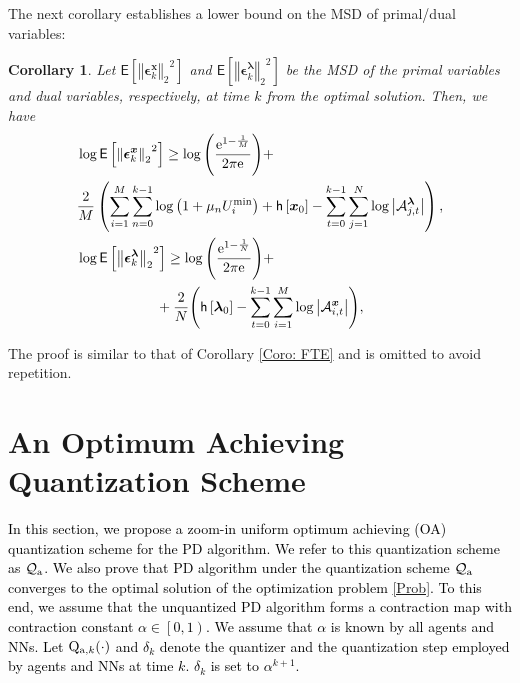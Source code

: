 \documentclass[10pt,twocolumn,twoside]{IEEEtran}
\newtheorem{corollary}{Corollary}
\begin{document}
The next corollary establishes a lower bound on the MSD of primal/dual variables:
\begin{corollary}\label{Coro: FTE-P}
Let ${\ensuremath{\mathsf{E}\left[{{\left\Vert{{\ensuremath{\boldsymbol{{\epsilon}}}}^{{\ensuremath{\boldsymbol{{x}}}}}_k}\right\Vert_{{2}}}^2} \right]}}$ and ${\ensuremath{\mathsf{E}\left[{{\left\Vert{{\ensuremath{\boldsymbol{{\epsilon}}}}^{{\ensuremath{\boldsymbol{{\lambda}}}}}_k}\right\Vert_{{2}}}^2} \right]}}$ be the MSD of the primal variables and dual variables, respectively, at time $k$ from the optimal solution. Then, we have
\begin{align}
&\log{\ensuremath{\mathsf{E}\left[{{\left\Vert{{\ensuremath{\boldsymbol{{\epsilon}}}}^{{\ensuremath{\boldsymbol{{x}}}}}_k}\right\Vert_{{2}}}^2} \right]}}\geq {\ensuremath{\log{\left({{\frac{{\ensuremath{{\rm e}^{{1-\frac{1}{M}}}}}}{{2\pi {\ensuremath{{\rm e}^{{}}}}}}}}\right)}}}+ \nonumber\\
&\hspace{0cm}\frac{2}{M}\left(\sum_{i=1}^M\sum_{n=0}^{k-1}{{\ensuremath{\log{\left({{1+\mu_nU_i^{\min}}}\right)}}}}+\mathsf{h}\left[{\ensuremath{\boldsymbol{{x}}}}_{0}\right]-\sum_{t=0}^{k-1}\sum_{j=1}^N\log{\left|{\mathcal{A}^{{\ensuremath{\boldsymbol{{\lambda}}}}}_{j,t}}\right|}\right),\nonumber\\
&\log{\ensuremath{\mathsf{E}\left[{{\left\Vert{{\ensuremath{\boldsymbol{{\epsilon}}}}^{{\ensuremath{\boldsymbol{{\lambda}}}}}_k}\right\Vert_{{2}}}^2} \right]}}\geq {\ensuremath{\log{\left({{\frac{{\ensuremath{{\rm e}^{{1-\frac{1}{N}}}}}}{{2\pi {\ensuremath{{\rm e}^{{}}}}}}}}\right)}}}+ \nonumber\\
&\hspace{2cm}+\frac{2}{N}{\left({\mathsf{h}\left[{\ensuremath{\boldsymbol{{\lambda}}}}_{0}\right]-\sum_{t=0}^{k-1}\sum_{i=1}^M\log{\left|{\mathcal{A}^{{\ensuremath{\boldsymbol{{x}}}}}_{i,t}}\right|}}\right)},\nonumber
\end{align}
\end{corollary}
\begin{IEEEproof}
The proof is similar to that of Corollary \ref{Coro: FTE} and is omitted to avoid repetition. 
\end{IEEEproof}

\section{An Optimum Achieving Quantization Scheme}\label{Sec: AOAQ}

\textcolor{black}{In this section, we propose a zoom-in uniform optimum achieving (OA) quantization scheme for the PD algorithm. We refer to this quantization scheme as $\mathcal{Q}_{\rm a}$. We also prove that PD algorithm under the quantization scheme $\mathcal{Q}_{\rm a}$  converges to the optimal solution of the optimization problem \eqref{Prob}. To this end, we assume that the unquantized PD algorithm forms a contraction map with contraction constant $\alpha\in\left[0,\left.1\right)\right.$. We assume that $\alpha$ is known by all agents and NNs.  Let ${\rm Q}_{{\rm a},k}{\left({\cdot}\right)}$ and $\delta_k$ denote the quantizer and the quantization step employed by agents and NNs at time $k$. $\delta_k$ is set to $\alpha^{k+1}$. }
\end{document}
